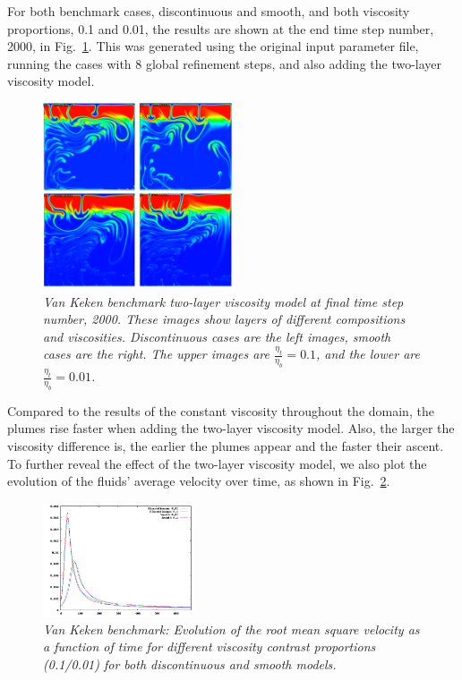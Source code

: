 \documentclass{article}
\begin{document}
For both benchmark cases, discontinuous and smooth, and both viscosity proportions, 0.1 and 0.01, the results are shown at the end time step number, 2000, in Fig.~\ref{fig:vk-8}.  This was generated using the original input parameter file, running the cases with 8 global refinement steps, and also adding the two-layer viscosity model.

\begin{figure}
        \centering
        \includegraphics[width=0.5\textwidth]{cookbooks/benchmarks/van-keken/2viscosities-final.png}
        \caption{\it Van Keken benchmark two-layer viscosity model at final time step number, 2000. These images show layers of different compositions and viscosities. Discontinuous cases are the left images, smooth cases are the right. The upper images are $\frac{\eta_{t}}{\eta_{b}}=0.1$, and the lower are $\frac{\eta_{t}}{\eta_{b}}=0.01$.}
        \label{fig:vk-8}
\end{figure}

Compared to the results of the constant viscosity throughout the domain, the plumes rise faster when adding the two-layer viscosity model. Also, the larger the viscosity difference is, the earlier the plumes appear and the faster their ascent. To further reveal the effect of the two-layer viscosity model, we also plot the evolution of the fluids' average velocity over time, as shown in Fig.~\ref{fig:vk-9}.

\begin{figure}
        \centering
        \includegraphics[width=0.4\textwidth]{cookbooks/benchmarks/van-keken/2viscosities-velocity.png}
        \caption{\it Van Keken benchmark: Evolution of the root mean square velocity as a function of time for different viscosity contrast proportions (0.1/0.01) for both discontinuous and smooth models.}
        \label{fig:vk-9}
\end{figure}
\end{document}
